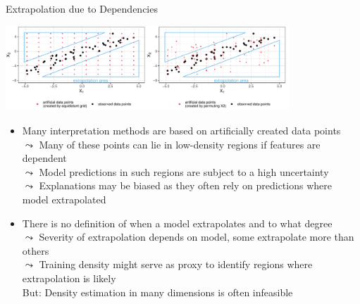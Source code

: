 \documentclass[11pt,compress,t,notes=noshow, aspectratio=169, xcolor=table]{beamer}
\begin{document}
\begin{frame}{Extrapolation due to Dependencies}
\centerline{\includegraphics[width=0.8\textwidth]{figure/extrapolation}}

\begin{itemize}
\item Many interpretation methods are based on
artificially created data points \\
$\leadsto$ Many of these points can lie in low-density regions if features are dependent\\
$\leadsto$ Model predictions in such regions are subject to a high uncertainty\\ %
$\leadsto$ Explanations may be biased as they often rely on predictions where model extrapolated\\
\pause
\item There is no definition of when a model extrapolates and to what degree \\
$\leadsto$ Severity of extrapolation depends on model, some extrapolate more than others \\
$\leadsto$ Training density might serve as proxy to identify regions where extrapolation is likely \\
\phantom{$\leadsto$} But: Density estimation in many dimensions is often infeasible
\end{itemize}

\end{frame}
\end{document}
